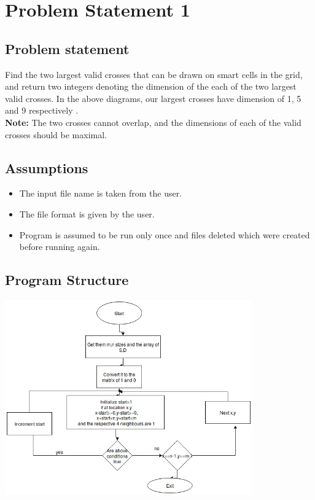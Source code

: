 \documentclass[12pt]{article}
\begin{document}
\pagebreak
\tableofcontents
\pagebreak

\section{Problem Statement 1}
\subsection{Problem statement}{
\textbf{}
Find the two largest valid crosses that can be drawn on smart cells in the grid, and return two integers denoting the dimension of the each of the two largest valid crosses. In the above diagrams, our largest crosses have dimension of 1,  5 and 9 respectively .\\

\textbf{Note:} The two crosses cannot overlap, and the dimensions of each of the valid crosses should be maximal.\\


\subsection{Assumptions}
{
\begin{itemize}
\item The input file name is taken from the user.
\item The file format is given by the user.
\item Program is assumed to be run only once and files deleted which were created before running again.

\end{itemize}
}

\subsection{Program Structure}

{
\begin{center}
\includegraphics[width=0.8\textwidth]{ps1.jpg}\\
\end{center}
}
\newpage

}
\end{document}

